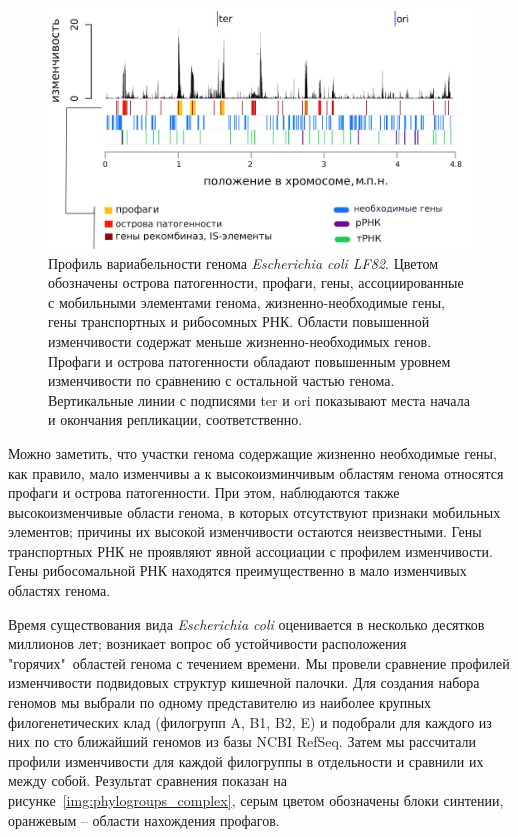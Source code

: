 \begin{figure}[!ht] 
    \center
      \includegraphics[width=\textwidth]{Dissertation/images/complexity/figure5plus.png}
    \caption{Профиль вариабельности генома \textit{Escherichia coli LF82}. Цветом обозначены острова патогенности, профаги,  гены, ассоциированные с мобильными элементами генома, жизненно-необходимые гены, гены транспортных и рибосомных РНК. Области повышенной изменчивости содержат меньше жизненно-необходимых генов. Профаги и острова патогенности обладают повышенным уровнем изменчивости по сравнению с остальной частью генома. Вертикальные линии с подписями ter и ori показывают места начала и окончания репликации, соответственно.}
    \label{img:complexity_lf82} 
  \end{figure}

Можно заметить, что участки генома содержащие жизненно необходимые гены, как правило, мало изменчивы а к высокоизминчивым областям генома относятся профаги и острова патогенности. При этом, наблюдаются также высокоизменчивые области генома, в которых отсутствуют признаки мобильных элементов; причины их высокой изменчивости остаются неизвестными. Гены транспортных РНК не проявляют явной ассоциации с профилем изменчивости. Гены рибосомальной РНК находятся преимущественно в мало изменчивых областях генома. 

Время существования вида \textit{Escherichia coli} оценивается в несколько десятков миллионов лет; возникает вопрос об устойчивости расположения "горячих"\ областей генома с течением времени. Мы провели сравнение профилей изменчивости подвидовых структур кишечной палочки. Для создания набора геномов мы выбрали по одному представителю из наиболее крупных филогенетических клад (филогрупп A, B1, B2, E) и подобрали для каждого из них по сто ближайший геномов из базы NCBI RefSeq. Затем мы рассчитали профили изменчивости для каждой филогруппы в отдельности и сравнили их между собой. Результат сравнения показан на рисунке~\ref{img:phylogroups_complex}, серым цветом обозначены блоки синтении, оранжевым -- области нахождения профагов.    

